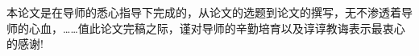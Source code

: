 
\begin{thanks}

本论文是在导师的悉心指导下完成的，从论文的选题到论文的撰写，无不渗透着导师的心血，……值此论文完稿之际，谨对导师的辛勤培育以及谆谆教诲表示最衷心的感谢!

\end{thanks}
